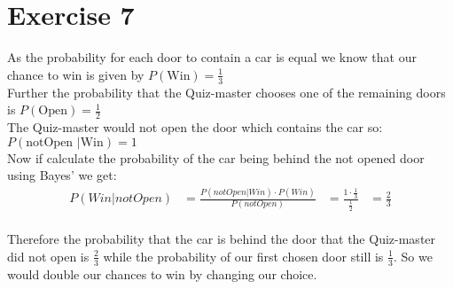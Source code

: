 \setcounter{equation}{0}
\section*{Exercise 7}

As the probability for each door to contain a car is equal we know that our chance to win is given by $P(\mbox{Win}) = \frac{1} 3$\\
Further the probability that the Quiz-master chooses one of the remaining doors is
$P(\mbox{Open}) = \frac{1} 2$\\
The Quiz-master would not open the door which contains the car so: \\
$P(\mbox{notOpen }|\mbox{Win}) = 1$\\
Now if calculate the probability of the car being behind the not opened door using Bayes' we get:
\begin{align}
& & P(Win|notOpen) & = \frac{P(notOpen|Win) \cdot P(Win)}{P(notOpen)} & = \frac{1 \cdot \frac{1}{3}}{\frac{1}{2}} &= \frac{2}{3}& &
\end{align}
\\
Therefore the probability that the car is behind the door that the Quiz-master did not open is $\frac{2}{3}$ while the probability of our first chosen door still is $\frac{1}{3}$. So we would double our chances to win by changing our choice.



